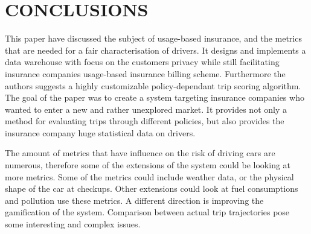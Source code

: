 \section{CONCLUSIONS}

This paper have discussed the subject of usage-based insurance, and the metrics that are needed for a fair characterisation of drivers. It designs and implements a data warehouse with focus on the customers privacy while still facilitating insurance companies usage-based insurance billing scheme. Furthermore the authors suggests a highly customizable policy-dependant trip scoring algorithm.
The goal of the paper was to create a system targeting insurance companies who wanted to enter a new and rather unexplored market. It provides not only a method for evaluating trips through different policies, but also provides the insurance company huge statistical data on drivers.

The amount of metrics that have influence on the risk of driving cars are numerous, therefore some of the extensions of the system could be looking at more metrics. Some of the metrics could include weather data, or the physical shape of the car at checkups. Other extensions could look at fuel consumptions and pollution use these metrics.
A different direction is improving the gamification of the system. Comparison between actual trip trajectories pose some interesting and complex issues.


\addtolength{\textheight}{-12cm}   %
